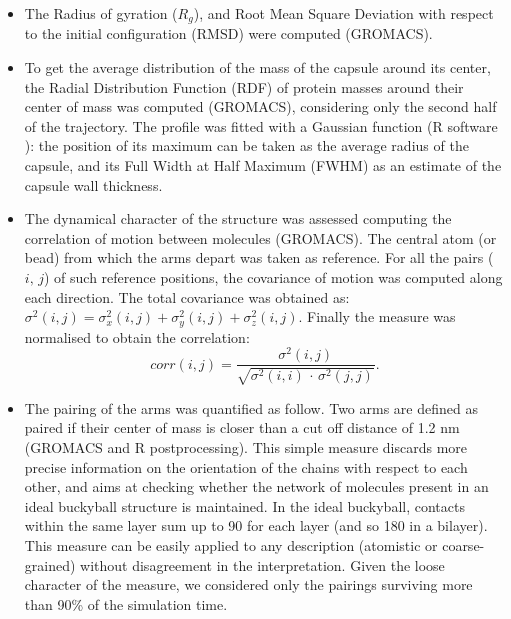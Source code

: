 \begin{itemize}
\item The Radius of gyration ($R_g$), and Root Mean Square Deviation with respect to the initial configuration (RMSD) were computed (GROMACS).

\item To get the average distribution of the mass of the capsule around its center, the Radial Distribution Function (RDF) of protein masses around their center of mass was computed (GROMACS), considering only the second half of the trajectory. The profile was fitted with a Gaussian function (R software \citep{R}): the position of its maximum can be taken as the average radius of the capsule, and its Full Width at Half Maximum (FWHM) as an estimate of the capsule wall thickness.

\item The dynamical character of the structure was assessed computing the correlation of motion between molecules (GROMACS). The central atom (or bead) from which the arms depart was taken as reference. For all the pairs ($i, \, j$) of such reference positions, the covariance of motion was computed along each direction. The total covariance was obtained as: $\sigma^2(i,j) = \sigma_x^2(i,j) + \sigma_y^2(i,j) + \sigma_z^2(i,j)$. Finally the measure was normalised to obtain the correlation:
\begin{equation}
corr(i,j) = \frac{\sigma^2(i,j)}{\sqrt{\sigma^2(i,i)\,\cdot\,\sigma^2(j,j)}}.
\end{equation}

\item The pairing of the arms was quantified as follow. Two arms are defined as paired if their center of mass is closer than a cut off distance of 1.2 nm (GROMACS and R postprocessing). This simple measure discards more precise information on the orientation of the chains with respect to each other, and aims at checking whether the network of molecules present in an ideal buckyball structure is maintained. In the ideal buckyball, contacts within the same layer sum up to 90 for each layer (and so 180 in a bilayer). This measure can be easily applied to any description (atomistic or coarse-grained) without disagreement in the interpretation. Given the loose character of the measure, we considered only the pairings surviving more than 90\% of the simulation time.


\end{itemize}
